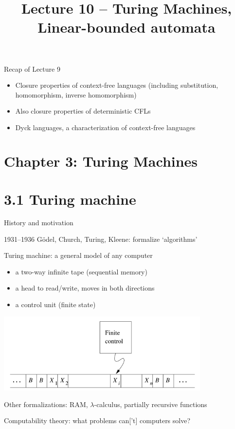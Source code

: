 \documentclass[handout]{beamer}
\title{Lecture 10 -- Turing Machines, Linear-bounded automata}
\begin{document}
\frame{\titlepage}


\begin{frame}{Recap of Lecture 9}
	
    \begin{itemize}        
        \item Closure properties of context-free languages (including substitution, homomorphism, inverse homomorphism)
        \item Also closure properties of deterministic CFLs
        \item Dyck languages, a characterization of context-free languages
    \end{itemize}
	
\end{frame}


\section{\sc Chapter 3: Turing Machines}


\section{3.1 Turing machine}


\begin{frame}{History and motivation}
    
    1931--1936 Gödel, Church, Turing, Kleene: formalize \alert{`algorithms'}
    
    \smallskip
    
    \alert{Turing machine}: a general model of any computer
    \begin{itemize}
        \item a two-way infinite \alert{tape} (sequential memory)
        \item a \alert{head} to read/write, moves in both directions
        \item a control unit (finite state)
    \end{itemize}
    \vspace{-9pt}
    \begin{center}
        \includegraphics[width=0.8\textwidth]{files/tm1.PNG}  
    \end{center}        
    \vspace{-9pt}
    Other formalizations: RAM, $\lambda$-calculus, partially recursive functions

    \alert{Computability theory}: what problems can['t] computers solve?

\end{frame}
\end{document}
